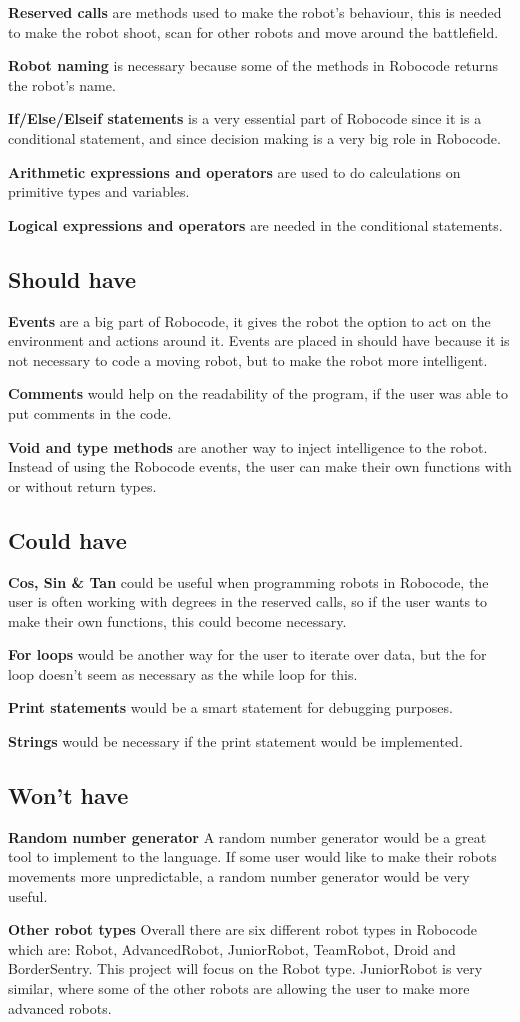\textbf{Reserved calls} are methods used to make the robot’s behaviour, this is needed to make the robot shoot, scan for other robots and move around the battlefield. 

\textbf{Robot naming} is necessary because some of the methods in Robocode returns the robot’s name. 

\textbf{If/Else/Elseif statements} is a very essential part of Robocode since it is a conditional statement, and since decision making is a very big role in Robocode.

\textbf{Arithmetic expressions and operators} are used to do calculations on primitive types and variables. 

\textbf{Logical expressions and operators} are needed in the conditional statements.

\subsection{Should have}
\textbf{Events} are a big part of Robocode, it gives the robot the option to act on the environment and actions around it. Events are placed in should have because it is not necessary to code a moving robot, but to make the robot more intelligent.

\textbf{Comments} would help on the readability of the program, if the user was able to put comments in the code. 

\textbf{Void and type methods} are another way to inject intelligence to the robot. Instead of using the Robocode events, the user can make their own functions with or without return types. 

\subsection{Could have} 
\textbf{Cos, Sin \& Tan} could be useful when programming robots in Robocode, the user is often working with degrees in the reserved calls, so if the user wants to make their own functions, this could become necessary.

\textbf{For loops} would be another way for the user to iterate over data, but the for loop doesn't seem as necessary as the while loop for this.

\textbf{Print statements} would be a smart statement for debugging purposes.

\textbf{Strings} would be necessary if the print statement would be implemented.

\subsection{Won't have} 
\textbf{Random number generator}
A random number generator would be a great tool to implement to the language. If some user would like to make their robots movements more unpredictable, a random number generator would be very useful.

\textbf{Other robot types} 
Overall there are six different robot types in Robocode which are: Robot, AdvancedRobot, JuniorRobot, TeamRobot, Droid and BorderSentry. This project will focus on the Robot type. JuniorRobot is very similar, where some of the other robots are allowing the user to make more advanced robots. 